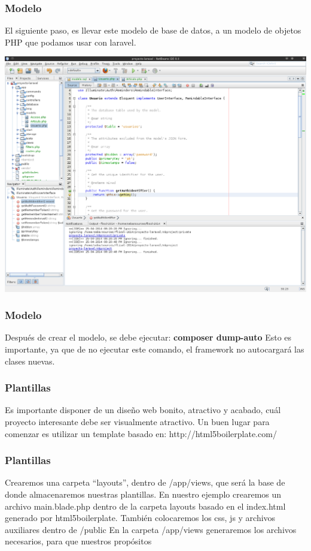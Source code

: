 \documentclass[12pt]{beamer}
\begin{document}
\begin{frame}
 \frametitle{Modelo}
 El siguiente paso, es llevar este modelo de base de datos, a un modelo de objetos PHP que podamos usar con laravel.
 \begin{center}
    \includegraphics[scale=0.3]{img/modelo_poo.png}
 \end{center}
\end{frame}

\begin{frame}
 \frametitle{Modelo}
 Después de crear el modelo, se debe ejecutar:
 \newline
 {\bf composer dump-auto}
 \newline
 Esto es importante, ya que de no ejecutar este comando, el framework no autocargará las clases nuevas.
\end{frame}



\begin{frame}
 \frametitle{Plantillas}
 Es importante disponer de un diseño web bonito, atractivo y acabado, cuál proyecto interesante debe ser visualmente atractivo.
 Un buen lugar para comenzar es utilizar un template basado en:
 \newline
 http://html5boilerplate.com/
\end{frame}


\begin{frame}
 \frametitle{Plantillas}
 Crearemos una carpeta ``layouts'', dentro de /app/views, que será la base de donde almacenaremos nuestras plantillas.
 \newline
 En nuestro ejemplo crearemos un archivo main.blade.php dentro de la carpeta layouts basado en el index.html generado por html5boilerplate. También colocaremos los css, js y archivos auxiliares dentro de /public
 \newline
 En la carpeta /app/views generaremos los archivos necesarios, para que nuestros propósitos
\end{frame}
\end{document}

